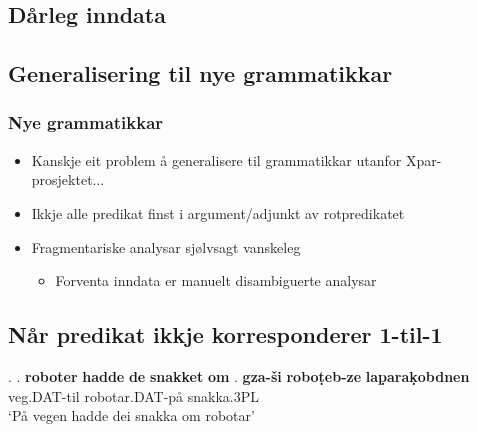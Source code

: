 \documentclass[xcolor=x11names,compress,bigger]{beamer}
\renewcommand{\(}{\begin{columns}}
\renewcommand{\)}{\end{columns}}
\newcommand{\<}[1]{\begin{column}{#1}}
\renewcommand{\>}{\end{column}}
\begin{document}
\subsection{Dårleg inndata}
\subsection{Generalisering til nye grammatikkar}
\begin{frame}\frametitle{Nye grammatikkar}
  \begin{itemize}
  \item Kanskje eit problem å generalisere til grammatikkar utanfor Xpar-prosjektet...
  \item Ikkje alle predikat finst i argument/adjunkt av rotpredikatet
  \item Fragmentariske analysar sjølvsagt vanskeleg
    \begin{itemize}
    \item Forventa inndata er manuelt disambiguerte analysar
    \end{itemize}
  \end{itemize}
\end{frame}


\subsection{Når predikat ikkje korresponderer 1-til-1}
\begin{frame}
    {\footnotesize\setlength{\Exlabelsep}{1.0em} %
    \alignSubExtrue %
    \ex. \a. \textbf{roboter} \textbf{hadde} \textbf{de} \textbf{snakket} \textbf{om}
    \bg. \textbf{gza-\v{s}i} \textbf{robo\d{t}eb-ze} \textbf{la\d{p}ara\d{k}obdnen} \\
    veg.DAT-til robotar.DAT-på snakka.3PL \\
    `På vegen hadde dei snakka om robotar'

  }
\end{frame}
\end{document}
